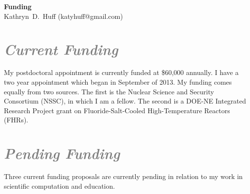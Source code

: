 \documentclass[a4paper, 12pt]{article}
\makeatletter
\newcommand{\authorname}{Kathryn~D.~Huff }
\newcommand{\authoremail}{katyhuff@gmail.com}
\newcommand{\authorsite}{katyhuff.github.com}
\makeatother
\begin{document}
\pagestyle{fancy}
\lhead{\textcolor{gray}{\it \authorname}}
\rhead{\textcolor{gray}{\thepage/\totalpages{}}}
\renewcommand{\headrulewidth}{0pt} 
\renewcommand{\footrulewidth}{0pt} 
\fancyfoot[C]{\footnotesize \textcolor{gray}{\authorsite}} 

\begin{center}
{\LARGE \bf Funding}\\
\vspace*{0.1cm}
{\normalsize \authorname (\authoremail)}
\end{center}





\section*{\textcolor{gray}{\it Current Funding}}
My postdoctoral appointment is currently funded at \$60,000 annually. I have a 
two year appointment which began in September of 2013.
My funding comes equally from two sources. The first is the Nuclear Science and Security 
Consortium (NSSC), in which I am a fellow. The second is a DOE-NE Integrated 
Research Project grant on Fluoride-Salt-Cooled High-Temperature Reactors (FHRs).  

\section*{\textcolor{gray}{\it Pending Funding}}
Three current funding proposals are currently pending in relation to my work in 
scientific computation and education.
\end{document}
